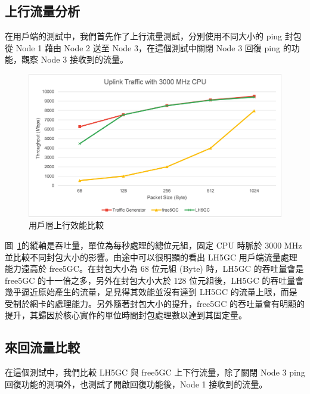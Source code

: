 \subsection{上行流量分析}
\label{subsec:uplink_evaluation}

在用戶端的測試中，我們首先作了上行流量測試，分別使用不同大小的 ping 封包從 Node 1 藉由 Node 2 送至 Node 3，在這個測試中關閉 Node 3 回復 ping 的功能，觀察 Node 3 接收到的流量。

\begin{figure}[htb]
    \centering
    \includegraphics[height=!,width=0.8\linewidth,keepaspectratio=true]{figures/up_eva_pkt_size}
    \caption[用戶層上行效能比較]{{\footnotesize 用戶層上行效能比較}}
    \label{fig:up_eva_pkt_size}
\end{figure}

圖~\ref{fig:up_eva_pkt_size}的縱軸是吞吐量，單位為每秒處理的總位元組，固定 CPU 時脈於 3000 MHz 並比較不同封包大小的影響。由途中可以很明顯的看出 LH5GC 用戶端流量處理能力遠高於 free5GC。在封包大小為 68 位元組 (Byte) 時，LH5GC 的吞吐量會是 free5GC 的十一倍之多，另外在封包大小大於 128 位元組後，LH5GC 的吞吐量會幾乎逼近原始產生的流量，足見得其效能並沒有達到 LH5GC 的流量上限，而是受制於網卡的處理能力。另外隨著封包大小的提升，free5GC 的吞吐量會有明顯的提升，其歸因於核心實作的單位時間封包處理數以達到其固定量。

\subsection{來回流量比較}
\label{subsec:uldl_comp}

在這個測試中，我們比較 LH5GC 與 free5GC 上下行流量，除了關閉 Node 3 ping 回復功能的測項外，也測試了開啟回復功能後，Node 1 接收到的流量。

